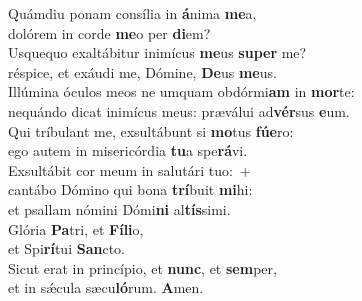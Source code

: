 \evenverse Quámdiu ponam consília in \textbf{á}nima \textbf{me}a,~\*\\
\evenverse dolórem in corde \textbf{me}o per \textbf{di}em?\\
\oddverse Usquequo exaltábitur inimícus \textbf{me}us \textbf{su}\textbf{per} me?~\*\\
\oddverse réspice, et exáudi me, Dómine, \textbf{De}us \textbf{me}us.\\
\evenverse Illúmina óculos meos ne umquam obdórmi\textbf{am} in \textbf{mor}te:~\*\\
\evenverse nequándo dicat inimícus meus: præválui ad\textbf{vér}sus \textbf{e}um.\\
\oddverse Qui tríbulant me, exsultábunt si \textbf{mo}tus \textbf{fú}\textbf{e}ro:~\*\\
\oddverse ego autem in misericórdia \textbf{tu}a spe\textbf{rá}vi.\\
\evenverse Exsultábit cor meum in salutári tuo:~+\\
\evenverse  cantábo Dómino qui bona \textbf{trí}buit \textbf{mi}hi:~\*\\
\evenverse et psallam nómini Dómi\textbf{ni} al\textbf{tís}simi.\\
\oddverse Glória \textbf{Pa}tri, et \textbf{Fí}\textbf{li}o,~\*\\
\oddverse et Spi\textbf{rí}tui \textbf{San}cto.\\
\evenverse Sicut erat in princípio, et \textbf{nunc}, et \textbf{sem}per,~\*\\
\evenverse et in sǽcula sæcu\textbf{ló}rum. \textbf{A}men.\\
